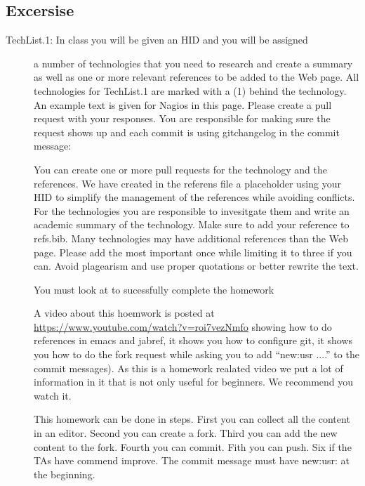 \subsection{Excersise}
\label{\detokenize{i524/technologies:excersise}}\label{\detokenize{i524/technologies:techs-exercise}}\begin{description}
\item[{TechList.1: In class you will be given an HID and you will be assigned}] \leavevmode
a number of technologies that you need to research and create a
summary as well as one or more relevant references to be added to the
Web page. All technologies for TechList.1 are marked with a (1)
behind the technology.  An example text is given for Nagios in this
page.  Please create a pull request with your responses. You are
responsible for making sure the request shows up and each commit is
using gitchangelog in the commit message:

\begin{sphinxVerbatim}[commandchars=\\\{\}]
    
\end{sphinxVerbatim}

You can create one or more pull requests for the technology and the
references. We have created in the referens file a placeholder using
your HID to simplify the management of the references while avoiding
conflicts.  For the technologies you are responsible to invesitgate
them and write an academic summary of the technology. Make sure to
add your reference to refs.bib.  Many technologies may have
additional references than the Web page. Please add the most
important once while limiting it to three if you can. Avoid
plagearism and use proper quotations or better rewrite the text.

You must look at  to sucessfully complete the
homework

A video about this hoemwork is posted at
\url{https://www.youtube.com/watch?v=roi7vezNmfo} showing how to
do references in emacs and jabref, it shows you how to configure
git, it shows you how to do the fork request while asking you to add
``new:usr ....'' to the commit messages). As this is a homework
realated video we put a lot of information in it that is not only
useful for beginners. We recommend you watch it.

This homework can be done in steps. First you can collect all the
content in an editor. Second you can create a fork. Third you can
add the new content to the fork. Fourth you can commit. Fith you
can push. Six if the TAs have commend improve. The commit message
must have new:usr: at the beginning.


\end{description}
